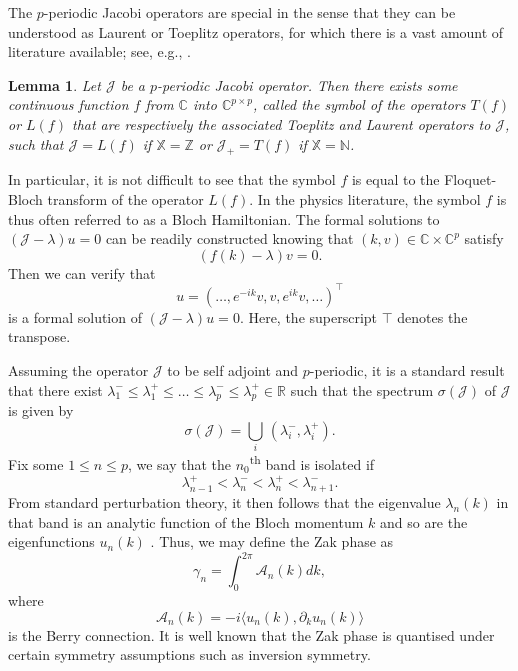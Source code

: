 \documentclass[a4paper,reqno,twoside]{amsart}
\numberwithin{equation}{section}
\newtheorem{lemma}[theorem]{Lemma}
\theoremstyle{definition}
\newcommand{\<}{\ensuremath \leq}
\renewcommand{\>}{\ensuremath \geq}
\begin{document}
The $p$-periodic Jacobi operators are special in the sense that they can be understood as Laurent or Toeplitz operators, for which there is a vast amount of literature available; see, e.g., \cite{bottcher.silbermann1999Introduction, trefethen.embree2020Spectra,ammari.barandun.ea2024Spectra}. 
\begin{lemma}
    Let $\mathcal{J}$ be a $p$-periodic Jacobi operator. Then there exists some continuous function $f$ from $\mathbb{C}$ into $\mathbb{C}^{p\times p}$, called the symbol of the operators $T(f)$ or $L(f)$ that are respectively the associated Toeplitz and Laurent operators to $\mathcal{J}$, such that $\mathcal{J} = L(f)$ if $\mathbb{X} = \mathbb{Z}$ or $\mathcal{J}_+ = T(f)$ if $\mathbb{X} = \mathbb{N}$. 
\end{lemma}
In particular, it is not difficult to see that the symbol $f$ is equal to the Floquet-Bloch transform of the operator $L(f)$. In the physics literature, the symbol $f$ is thus often referred to as a Bloch Hamiltonian. The formal solutions to $(\mathcal{J}-\lambda)u=0$ can be readily constructed knowing that $(k,v)\in\mathbb{C}\times\mathbb{C}^p$ satisfy 
\begin{equation}
    (f(k)-\lambda)v=0.
\end{equation}
Then we can verify that
\begin{equation}
    u=(\dots,e^{-ik}v,v,e^{ik}v, \dots)^\top
\end{equation}
is a formal solution of $(\mathcal{J}-\lambda)u=0$. Here, the superscript $\top$ denotes the transpose. 

Assuming the operator $\mathcal{J}$ to be self adjoint and $p$-periodic, it is a standard result that there exist $\lambda_1^-\leq\lambda_1^+\leq\dots\leq\lambda_p^-\leq\lambda_p^+\in \mathbb{R}$ such that the spectrum  $\sigma(\mathcal{J})$ of $\mathcal{J}$ is given by 
\begin{equation*}
    \sigma(\mathcal{J}) = \bigcup_i \, (\lambda_i^-,\lambda_i^+).
\end{equation*}
Fix some $1\leq n\leq p$, we say that the $n_0$\textsuperscript{th} band is isolated if 
\begin{equation}
    \lambda_{n-1}^+ < \lambda_{n}^-<\lambda_{n}^+ < \lambda_{n+1}^-.
\end{equation}
From standard perturbation theory, it then follows that the eigenvalue $\lambda_{n}(k)$ in that band is an analytic function of the Bloch momentum $k$ and so are the eigenfunctions $u_{n}(k)$ \cite{kato1995Perturbation, kuchment2016overview}. Thus, we may define the Zak phase \cite{Vanderbilt2018, resta1994macroscopic,zak1989berry} as
\begin{equation}
    \gamma_{n} = \int_0^{2\pi} \mathcal{A}_{n}(k) dk,
\end{equation}
where
\begin{equation}
    \mathcal{A}_{n}(k) = -i\langle u_n(k),\partial_k u_n(k)\rangle
\end{equation}
is the Berry connection. It is well known that the Zak phase is quantised under certain symmetry assumptions such as inversion symmetry.
\end{document}
